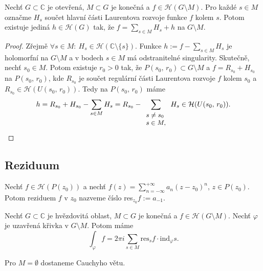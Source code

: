 \begin{theorem}
Nechť $G \subset \mathbb{C}$ je otevřená, $M \subset G$ je konečná a $f \in \mathcal{H}(G \setminus M)$. Pro každé $s \in M$ označme $H_s$ součet hlavní části Laurentova rozvoje funkce $f$ kolem $s$. Potom existuje jediná $h \in \mathcal{H}(G)$ tak, že $f=\sum\limits_{s\in M} H_s+h$ na $G \setminus M$.
\end{theorem}
\begin{proof}
Zřejmě $\forall s \in M:\ H_s \in \mathcal{H}(\mathbb{C} \setminus \{s \})$. Funkce $h:=f-\sum\limits_{s\in M} H_s$ je holomorfní na $G \setminus M$ a v bodech $s \in M$ má odstranitelné singularity. Skutečně, nechť $s_0 \in M$. Potom existuje $r_0>0$ tak, že $P(s_0,\,r_0) \subset G \setminus M$ a $f=R_{s_0}+H_{s_0}$ na $P(s_0,\,r_0)$, kde $R_{s_0}$ je součet regulární části Laurentova rozvoje $f$ kolem $s_0$ a $R_{s_0}\in \mathcal{H}(U(s_0,\,r_0))$. Tedy na $P(s_0,\,r_0)$ máme
$$h=R_{s_0}+H_{s_0}-\sum\limits_{s\in M} H_s=R_{s_0}-\sum\limits_{
\small{\begin{array}l
s \neq s_0\\
s\in M,
\end{array}}}
H_s \in \mathcal{H}(U(s_0,\,r_0)).$$
\end{proof}

\subsection{Reziduum}
\begin{definition}
Nechť $f \in \mathcal{H}(P(z_0))$ a nechť $f(z)=\sum\limits_{n=-\infty}^{+\infty}a_n(z-z_0)^n$, $z\in P(z_0)$. Potom reziduem $f$ v $z_0$ nazveme číslo res$_{z_0}f:=a_{-1}$.
\end{definition}

\begin{theorem}
Nechť $G \subset \mathbb{C}$ je hvězdovitá oblast, $M \subset G$ je konečná a $f \in \mathcal{H}(G \setminus M)$. Nechť $\varphi$ je uzavřená křivka v $G \setminus M$. Potom máme 
\begin{equation}
    \int_\varphi f=2\pi i \sum\limits_{s\in M}\text{res}_sf \cdot \text{ind}_\varphi s.
    \tag{RV}
    \label{eqn:7.31.RV}
\end{equation}
\end{theorem}

\begin{note*}
Pro $M=\emptyset$ dostaneme Cauchyho větu.
\end{note*}

